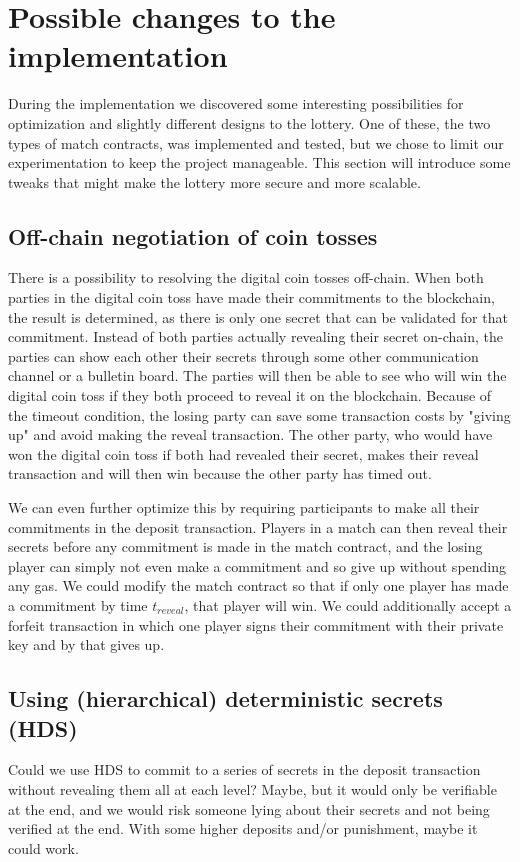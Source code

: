 \section{Possible changes to the implementation}
\label{sec:optimizations}

During the implementation we discovered some interesting possibilities for optimization and slightly different designs to the lottery. One of these, the two types of match contracts, was implemented and tested, but we chose to limit our experimentation to keep the project manageable. This section will introduce some tweaks that might make the lottery more secure and more scalable.


\subsection{Off-chain negotiation of coin tosses}
There is a possibility to resolving the digital coin tosses off-chain. When both parties in the digital coin toss have made their commitments to the blockchain, the result is determined, as there is only one secret that can be validated for that commitment. Instead of both parties actually revealing their secret on-chain, the parties can show each other their secrets through some other communication channel or a bulletin board. The parties will then be able to see who will win the digital coin toss if they both proceed to reveal it on the blockchain. Because of the timeout condition, the losing party can save some transaction costs by "giving up" and avoid making the reveal transaction. The other party, who would have won the digital coin toss if both had revealed their secret, makes their reveal transaction and will then win because the other party has timed out.

We can even further optimize this by requiring participants to make all their commitments in the deposit transaction. Players in a match can then reveal their secrets before any commitment is made in the match contract, and the losing player can simply not even make a commitment and so give up without spending any gas. We could modify the match contract so that if only one player has made a commitment by time $t_{reveal}$, that player will win. We could additionally accept a forfeit transaction in which one player signs their commitment with their private key and by that gives up.

\subsection{Using (hierarchical) deterministic secrets (HDS)}
Could we use HDS to commit to a series of secrets in the deposit transaction without revealing them all at each level? Maybe, but it would only be verifiable at the end, and we would risk someone lying about their secrets and not being verified at the end. With some higher deposits and/or punishment, maybe it could work.


